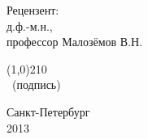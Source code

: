 \documentclass[a4paper, 14pt]{extarticle}
\begin{document}
\begin{titlepage}
\begin{flushleft}
        \hspace{85mm} \small{Рецензент:}\\
        \hspace{85mm} \small{д.ф.-м.н.,}\\
        \hspace{85mm} \small{профессор Малозёмов В.Н.}
        \begin{flushright}
            \hspace{85mm} \line(1,0){210}\\\
            \small{(подпись)}
        \end{flushright}
    \end{flushleft}
    \begin{center}
        \bigskip
        \bigskip
        \bigskip
        \small{Санкт-Петербург}\\
        \small{2013}\\
    \end{center}
\end{titlepage} 
\end{document}
